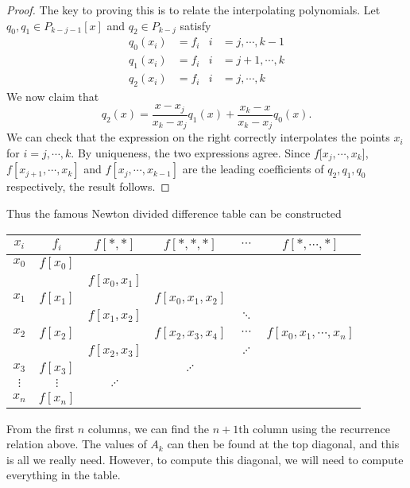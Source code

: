 \documentclass[a4paper]{article}
\begin{document}
\begin{proof}
  The key to proving this is to relate the interpolating polynomials. Let $q_0, q_1 \in P_{k - j - 1}[x]$ and $q_2 \in P_{k - j}$ satisfy
  \begin{align*}
    q_0(x_i) &= f_i & i &=j, \cdots, k - 1\\
    q_1(x_i) &= f_i & i &=j + 1, \cdots, k\\
    q_2(x_i) &= f_i & i &=j, \cdots, k
  \end{align*}
  We now claim that
  \[
    q_2(x) = \frac{x - x_j}{x_k - x_j} q_1(x) + \frac{x_k - x}{x_k - x_j} q_0(x).
  \]
  We can check that the expression on the right correctly interpolates the points $x_i$ for $i = j, \cdots, k$. By uniqueness, the two expressions agree. Since $f[x_j, \cdots, x_k$], $f[x_{j + 1}, \cdots, x_k]$ and $f[x_j, \cdots, x_{k - 1}]$ are the leading coefficients of $q_2, q_1, q_0$ respectively, the result follows.
\end{proof}
Thus the famous Newton divided difference table can be constructed
\begin{center}
  \begin{tabular}{cccccc}
    \toprule
    $x_i$ & $f_i$ & $f[*, *]$ & $f[*, *, *]$ & $\cdots$ & $f[*, \cdots,*]$\\
    \midrule
    $x_0$ & $f[x_0]$\\
    & & $f[x_0, x_1]$\\
    $x_1$ & $f[x_1]$ & & $f[x_0, x_1, x_2]$ \\
    & & $f[x_1, x_2]$ & & $\ddots$\\
    $x_2$ & $f[x_2]$ & & $f[x_2, x_3, x_4]$ & $\cdots$ & $f[x_0, x_1, \cdots, x_n]$\\
    & & $f[x_2, x_3]$ & & $\iddots$\\
    $x_3$ & $f[x_3]$ & & $\iddots$\\
    $\vdots$ & $\vdots$ & $\iddots$ &\\
    $x_n$ & $f[x_n]$\\
    \bottomrule
  \end{tabular}
\end{center} %
From the first $n$ columns, we can find the $n + 1$th column using the recurrence relation above. The values of $A_k$ can then be found at the top diagonal, and this is all we really need. However, to compute this diagonal, we will need to compute everything in the table.
\end{document}
